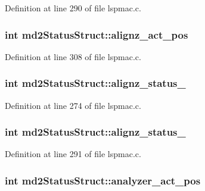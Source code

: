 Definition at line 290 of file lspmac.\-c.

\hypertarget{structmd2StatusStruct_a480f892fe91b05b2980fb00064807e2b}{
\subsubsection[{alignz\-\_\-act\-\_\-pos}]{\setlength{\rightskip}{0pt plus 5cm}int md2\-Status\-Struct\-::alignz\-\_\-act\-\_\-pos}}\label{structmd2StatusStruct_a480f892fe91b05b2980fb00064807e2b}


Definition at line 308 of file lspmac.\-c.

\hypertarget{structmd2StatusStruct_aadbfac5709de57e449a37e2937d6ade7}{
\subsubsection[{alignz\-\_\-status\-\_\-1}]{\setlength{\rightskip}{0pt plus 5cm}int md2\-Status\-Struct\-::alignz\-\_\-status\-\_}}\label{structmd2StatusStruct_aadbfac5709de57e449a37e2937d6ade7}


Definition at line 274 of file lspmac.\-c.

\hypertarget{structmd2StatusStruct_ac378da16eeaab2bc47f3f8f88f7411ed}{
\subsubsection[{alignz\-\_\-status\-\_\-2}]{\setlength{\rightskip}{0pt plus 5cm}int md2\-Status\-Struct\-::alignz\-\_\-status\-\_}}\label{structmd2StatusStruct_ac378da16eeaab2bc47f3f8f88f7411ed}


Definition at line 291 of file lspmac.\-c.

\hypertarget{structmd2StatusStruct_a49d1151b0e819646587be0ca9c9d612a}{
\subsubsection[{analyzer\-\_\-act\-\_\-pos}]{\setlength{\rightskip}{0pt plus 5cm}int md2\-Status\-Struct\-::analyzer\-\_\-act\-\_\-pos}}\label{structmd2StatusStruct_a49d1151b0e819646587be0ca9c9d612a}


